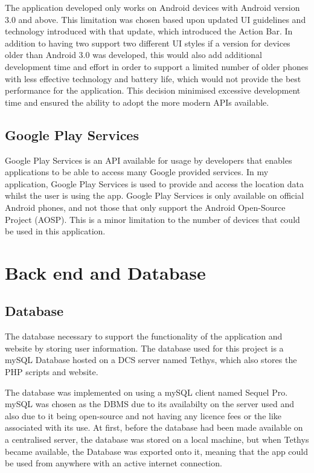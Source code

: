 \documentclass{l4proj}
\begin{document}
The application developed only works on Android devices with Android version 3.0 and above. This limitation was chosen based upon updated UI guidelines and technology introduced with that update, which introduced the Action Bar. In addition to having two support two different UI styles if a version for devices older than Android 3.0 was developed, this would also add additional development time and effort in order to support a limited number of older phones with less effective technology and battery life, which would not provide the best performance for the application. This decision minimised excessive development time and ensured the ability to adopt the more modern APIs available.

\subsection{Google Play Services}

Google Play Services is an API available for usage by developers that enables applications to be able to access many Google provided services. In my application, Google Play Services is used to provide and access the location data whilst the user is using the app. Google Play Services is only available on official Android phones, and not those that only support the Android Open-Source Project (AOSP). This is a minor limitation to the number of devices that could be used in this application.

\section{Back end and Database}

\subsection{Database}

The database necessary to support the functionality of the application and website by storing user information. The database used for this project is a mySQL Database hosted on a DCS server named Tethys, which also stores the PHP scripts and website.

The database was implemented on using a mySQL client named Sequel Pro. mySQL was chosen as the DBMS due to its availabilty on the server used and also due to it being open-source and not having any licence fees or the like associated with its use. At first, before the database had been made available on a centralised server, the database was stored on a local machine, but when Tethys became available, the Database was exported onto it, meaning that the app could be used from anywhere with an active internet connection.
\end{document}
